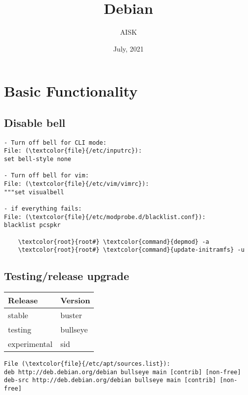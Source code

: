 \documentclass[10pt, a4paper, onecolumn, openany]{book} %
\title{\textbf{Debian}}
\author{AISK}
\date{July, 2021}
\begin{document}
\maketitle
\tableofcontents

\chapter{Basic Functionality}
\section{Disable bell}
\begin{Verbatim}[commandchars=\\\{\}]
- Turn off bell for CLI mode:
File: (\textcolor{file}{/etc/inputrc}):
set bell-style none

- Turn off bell for vim:
File: (\textcolor{file}{/etc/vim/vimrc}):
"""set visualbell

- if everything fails:
File: (\textcolor{file}{/etc/modprobe.d/blacklist.conf}):
blacklist pcspkr

    \textcolor{root}{root#} \textcolor{command}{depmod} -a
    \textcolor{root}{root#} \textcolor{command}{update-initramfs} -u
\end{Verbatim}


\section{Testing/release upgrade}
\begin{center}
    \begin{small}
    \begin{tabular}{|p{4cm}|p{4cm}|}
    \hline
    \textbf{Release} & \textbf{Version} \\
    \hline
    stable & buster \\
    \hline
    testing & bullseye \\
    \hline
    experimental & sid \\
    \hline
    \end{tabular}
    \end{small}
\end{center}

\begin{Verbatim}[commandchars=\\\{\}]
File (\textcolor{file}{/etc/apt/sources.list}):
deb http://deb.debian.org/debian bullseye main [contrib] [non-free]
deb-src http://deb.debian.org/debian bullseye main [contrib] [non-free]
\end{Verbatim}
\end{document}
